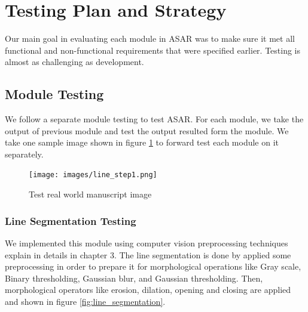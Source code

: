 \section{Testing Plan and Strategy}
Our main goal in evaluating each module in ASAR was to make sure it met all functional and non-functional requirements that were specified earlier. Testing is almost as challenging as development.

\subsection{Module Testing}
We follow a separate module testing to test ASAR. For each module, we take the output of previous module and test the output resulted form the module. We take one sample image shown in figure \ref{fig:real-world-sample} to forward test each module on it separately.

\begin{figure}[H]
    \centering
    \texttt{[image: images/line\_step1.png]}
    \caption{Test real world manuscript image}
    \label{fig:real-world-sample}
\end{figure}

\subsubsection{Line Segmentation Testing}

We implemented this module using computer vision preprocessing techniques explain in details in chapter 3. The line segmentation is done by applied some preprocessing in order to prepare it for morphological operations like Gray scale, Binary thresholding, Gaussian blur, and Gaussian thresholding. Then, morphological operators like erosion, dilation, opening and closing are applied and shown in figure
\ref{fig:line_segmentation}.

